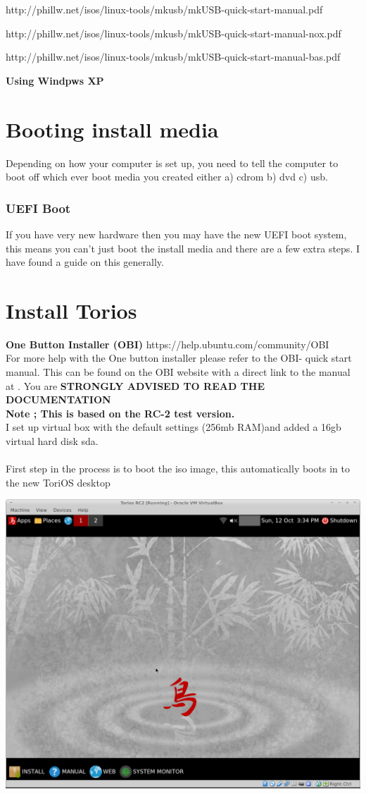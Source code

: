 \documentclass[12pt,a4paper]{book}
\begin{document}
http://phillw.net/isos/linux-tools/mkusb/mkUSB-quick-start-manual.pdf

http://phillw.net/isos/linux-tools/mkusb/mkUSB-quick-start-manual-nox.pdf

http://phillw.net/isos/linux-tools/mkusb/mkUSB-quick-start-manual-bas.pdf

\textbf{Using Windpws XP}

\newpage 

\chapter{Booting install media}

Depending on how your computer is set up,  you need to tell the computer to boot off which ever boot media you created either a) cdrom b) dvd c) usb. \\

\subsection{UEFI Boot}
If you have very new hardware then you may have the new UEFI boot system,  this means you can't just boot the install media and there are a few extra steps. I have found a guide \cite{UEFILinux} on this generally. 
\newpage

\chapter{Install Torios}
\textbf{One Button Installer (OBI) }
https://help.ubuntu.com/community/OBI\\
For more help with the One button installer please refer to the OBI- quick start manual. This can be found on the OBI website \cite{OBI} with a direct link to the manual at \cite{OBI Quickstart}. You are \textbf{STRONGLY ADVISED TO READ THE DOCUMENTATION}
\\
\textbf{Note ; This is based on the RC-2 test version.}
\linebreak \\
I set up virtual box with the default settings (256mb RAM)and added a 16gb virtual hard disk sda. \\
\\
First step in the process is to boot the iso image,  this automatically boots in to the new ToriOS desktop

\includegraphics[width=0.7\linewidth]{toriosRC2} 
\\
\end{document}
